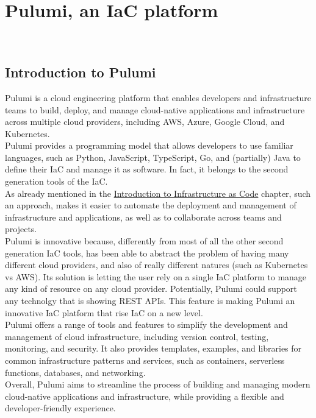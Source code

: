 
\chapter{Pulumi, an IaC platform}
\label{cap:introduction-pulumi}

\\

\section{Introduction to Pulumi}
Pulumi is a cloud engineering platform that enables developers and infrastructure teams to build, deploy, and manage cloud-native applications and infrastructure across multiple cloud providers, including AWS, Azure, Google Cloud, and Kubernetes.\\
Pulumi provides a programming model that allows developers to use familiar languages, such as Python, JavaScript, TypeScript, Go, and (partially) Java to define their IaC and manage it as software.
In fact, it belongs to the second generation tools of the IaC.\\
As already mentioned in the \hyperref[cap:introduction-to-iac]{Introduction to Infrastructure as Code} chapter, such an approach, makes it easier to automate the deployment and management of infrastructure and applications, as well as to collaborate across teams and projects.\\
Pulumi is innovative because, differently from most of all the other second generation IaC tools, has been able to abstract the problem of having many different cloud providers, and also of really different natures (such as Kubernetes vs AWS).
Its solution is letting the user rely on a single IaC platform to manage any kind of resource on any cloud provider.
Potentially, Pulumi could support any technolgy that is showing \gls{REST API}s.
This feature is making Pulumi an innovative IaC platform that rise IaC on a new level.\\
Pulumi offers a range of tools and features to simplify the development and management of cloud infrastructure, including version control, testing, monitoring, and security.
It also provides templates, examples, and libraries for common infrastructure patterns and services, such as containers, serverless functions, databases, and networking.\\
Overall, Pulumi aims to streamline the process of building and managing modern cloud-native applications and infrastructure, while providing a flexible and developer-friendly experience.

